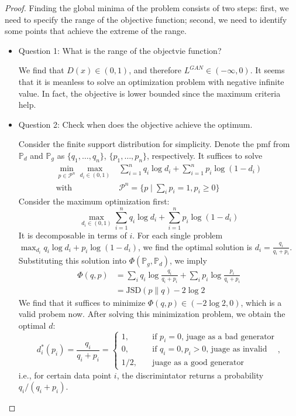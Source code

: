 \begin{proof}
Finding the global minima of the problem consists of two steps: 
first, we need to specify the range of the objective function; 
second, we need to identify some points that achieve the extreme of the range. 
\begin{itemize}
\item
Question 1: What is the range of the objectvie function?

We find that $D(x)\in(0,1)$, and therefore $L^{GAN}\in(-\infty,0)$.
It seems that it is meanless to solve an optimization problem with negative infinite value.
In fact, the objective is lower bounded since the maximum criteria help.
\item
Question 2: Check when does the objective achieve the optimum.

Consider the finite support distribution for simplicity.
Denote the pmf from $\mathbb{P}_d$ and $\mathbb{P}_g$ as $\{q_1,\dots,q_n\}$, $\{p_1,\dots,p_n\}$, respectively.
It suffices to solve
\[
\begin{array}{ll}
\min_{p\in \mathcal{P}^n}\max_{d_i\in(0,1)}&\sum_{i=1}^nq_i\log d_i + \sum_{i=1}^np_i\log(1-d_i)\\
\text{with}&\mathcal{P}^n=\{p\mid \sum_ip_i=1,p_i\ge0\}
\end{array}
\]
Consider the maximum optimization first:
\[
\max_{d_i\in(0,1)}\sum_{i=1}^nq_i\log d_i + \sum_{i=1}^np_i\log(1-d_i)
\]
It is decomposable in terms of $i$. For each single problem $\max_{d_i}q_i\log d_i + p_i\log(1-d_i)$, we find the optimal solution is $d_i = \frac{q_i}{q_i+p_i}$.
Substituting this solution into $\Phi(\mathbb{P}_g,\mathbb{P}_d)$, we imply
\begin{align*}
\Phi(q,p) &= \sum_iq_i\log\frac{q_i}{q_i+p_i}+
 \sum_ip_i\log\frac{p_i}{q_i+p_i}\\
 &=\text{JSD}(p\| q)-2\log 2
\end{align*}
We find that it suffices to minimize $\Phi(q,p) \in(-2\log 2,0)$, which is a valid probem now.
After solving this minimization problem, we obtain the optimal $d$:
\[
d_i^*(p_i) = \frac{q_i}{q_i+p_i}=\left\{
\begin{aligned}
1,&\quad\text{if $p_i=0$, juage as a bad generator}\\
0,&\quad\text{if $q_i=0,p_i>0$, juage as invalid}\\
1/2,&\quad\text{juage as a good generator}
\end{aligned}
\right.,
\] 
i.e.,
for certain data point $i$, the discrimintator returns a probability $q_i/(q_i+p_i)$.

\end{itemize}
\end{proof}
